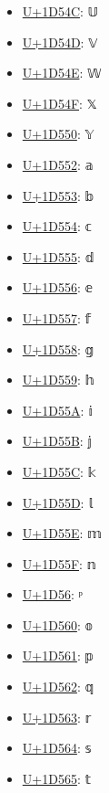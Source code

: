 \begin{itemize}
	\item \href{https://decodeunicode.org/en/u+1D54C}{U+1D54C}: 𝕌
	\item \href{https://decodeunicode.org/en/u+1D54D}{U+1D54D}: 𝕍
	\item \href{https://decodeunicode.org/en/u+1D54E}{U+1D54E}: 𝕎
	\item \href{https://decodeunicode.org/en/u+1D54F}{U+1D54F}: 𝕏
	\item \href{https://decodeunicode.org/en/u+1D550}{U+1D550}: 𝕐
	\item \href{https://decodeunicode.org/en/u+1D552}{U+1D552}: 𝕒
	\item \href{https://decodeunicode.org/en/u+1D553}{U+1D553}: 𝕓
	\item \href{https://decodeunicode.org/en/u+1D554}{U+1D554}: 𝕔
	\item \href{https://decodeunicode.org/en/u+1D555}{U+1D555}: 𝕕
	\item \href{https://decodeunicode.org/en/u+1D556}{U+1D556}: 𝕖
	\item \href{https://decodeunicode.org/en/u+1D557}{U+1D557}: 𝕗
	\item \href{https://decodeunicode.org/en/u+1D558}{U+1D558}: 𝕘
	\item \href{https://decodeunicode.org/en/u+1D559}{U+1D559}: 𝕙
	\item \href{https://decodeunicode.org/en/u+1D55A}{U+1D55A}: 𝕚
	\item \href{https://decodeunicode.org/en/u+1D55B}{U+1D55B}: 𝕛
	\item \href{https://decodeunicode.org/en/u+1D55C}{U+1D55C}: 𝕜
	\item \href{https://decodeunicode.org/en/u+1D55D}{U+1D55D}: 𝕝
	\item \href{https://decodeunicode.org/en/u+1D55E}{U+1D55E}: 𝕞
	\item \href{https://decodeunicode.org/en/u+1D55F}{U+1D55F}: 𝕟
	\item \href{https://decodeunicode.org/en/u+1D56}{U+1D56}: ᵖ
	\item \href{https://decodeunicode.org/en/u+1D560}{U+1D560}: 𝕠
	\item \href{https://decodeunicode.org/en/u+1D561}{U+1D561}: 𝕡
	\item \href{https://decodeunicode.org/en/u+1D562}{U+1D562}: 𝕢
	\item \href{https://decodeunicode.org/en/u+1D563}{U+1D563}: 𝕣
	\item \href{https://decodeunicode.org/en/u+1D564}{U+1D564}: 𝕤
	\item \href{https://decodeunicode.org/en/u+1D565}{U+1D565}: 𝕥

\end{itemize}
